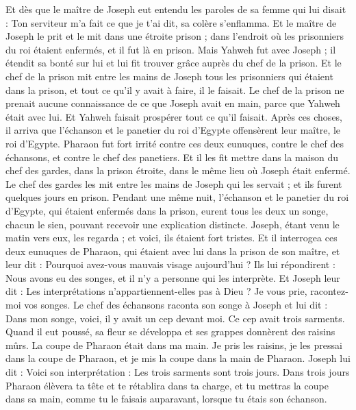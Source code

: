 \begin{multicols}{2}
Et dès que le maître de Joseph eut entendu les paroles de sa femme qui lui disait : Ton serviteur m'a fait ce que je t'ai dit, sa colère s'enflamma.
Et le maître de Joseph le prit et le mit dans une étroite prison ; dans l'endroit où les prisonniers du roi étaient enfermés, et il fut là en prison.
Mais Yahweh fut avec Joseph ; il étendit sa bonté sur lui et lui fit trouver grâce auprès du chef de la prison.
Et le chef de la prison mit entre les mains de Joseph tous les prisonniers qui étaient dans la prison, et tout ce qu'il y avait à faire, il le faisait.
Le chef de la prison ne prenait aucune connaissance de ce que Joseph avait en main, parce que Yahweh était avec lui. Et Yahweh faisait prospérer tout ce qu'il faisait.
\VerseOne{}Après ces choses, il arriva que l'échanson et le panetier du roi d'Egypte offensèrent leur maître, le roi d'Egypte.
Pharaon fut fort irrité contre ces deux eunuques, contre le chef des échansons, et contre le chef des panetiers.
Et il les fit mettre dans la maison du chef des gardes, dans la prison étroite, dans le même lieu où Joseph était enfermé.
Le chef des gardes les mit entre les mains de Joseph qui les servait ; et ils furent quelques jours en prison.
Pendant une même nuit, l’échanson et le panetier du roi d’Egypte, qui étaient enfermés dans la prison, eurent tous les deux un songe, chacun le sien, pouvant recevoir une explication distincte.
Joseph, étant venu le matin vers eux, les regarda ; et voici, ils étaient fort tristes.
Et il interrogea ces deux eunuques de Pharaon, qui étaient avec lui dans la prison de son maître, et leur dit : Pourquoi avez-vous mauvais visage aujourd'hui ?
Ils lui répondirent : Nous avons eu des songes, et il n'y a personne qui les interprète. Et Joseph leur dit : Les interprétations n’appartiennent-elles pas à Dieu ? Je vous prie, racontez-moi vos songes.
Le chef des échansons raconta son songe à Joseph et lui dit : Dans mon songe, voici, il y avait un cep devant moi.
Ce cep avait trois sarments. Quand il eut poussé, sa fleur se développa et ses grappes donnèrent des raisins mûrs.
La coupe de Pharaon était dans ma main. Je pris les raisins, je les pressai dans la coupe de Pharaon, et je mis la coupe dans la main de Pharaon.
Joseph lui dit : Voici son interprétation : Les trois sarments sont trois jours.
Dans trois jours Pharaon élèvera ta tête et te rétablira dans ta charge, et tu mettras la coupe dans sa main, comme tu le faisais auparavant, lorsque tu étais son échanson.

\end{multicols}
